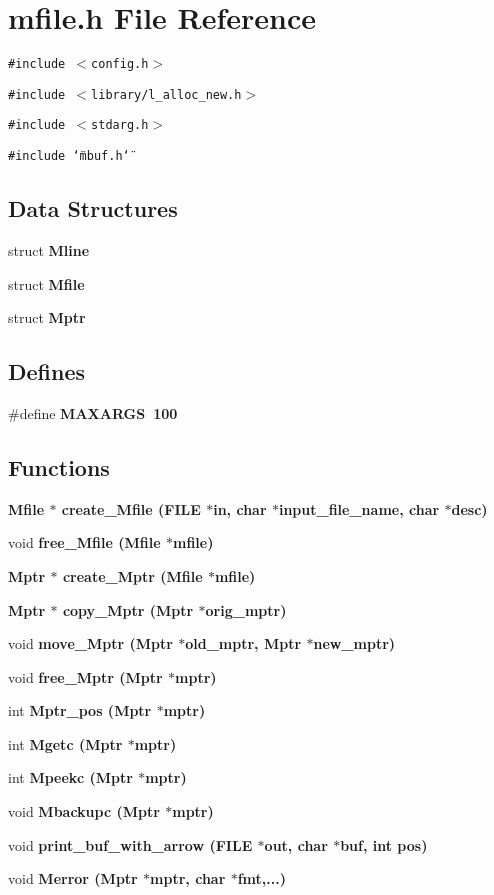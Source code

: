 \section{mfile.h File Reference}
\label{mfile_8h}
{\tt \#include $<$config.h$>$}\par
{\tt \#include $<$library/l\_\-alloc\_\-new.h$>$}\par
{\tt \#include $<$stdarg.h$>$}\par
{\tt \#include \char`\"{}mbuf.h\char`\"{}}\par
\subsection*{Data Structures}
\begin{CompactItemize}
\item 
struct \bf{Mline}
\item 
struct \bf{Mfile}
\item 
struct \bf{Mptr}
\end{CompactItemize}
\subsection*{Defines}
\begin{CompactItemize}
\item 
\#define \bf{MAXARGS}~100
\end{CompactItemize}
\subsection*{Functions}
\begin{CompactItemize}
\item 
\bf{Mfile} $\ast$ \bf{create\_\-Mfile} (FILE $\ast$in, char $\ast$input\_\-file\_\-name, char $\ast$desc)
\item 
void \bf{free\_\-Mfile} (\bf{Mfile} $\ast$mfile)
\item 
\bf{Mptr} $\ast$ \bf{create\_\-Mptr} (\bf{Mfile} $\ast$mfile)
\item 
\bf{Mptr} $\ast$ \bf{copy\_\-Mptr} (\bf{Mptr} $\ast$orig\_\-mptr)
\item 
void \bf{move\_\-Mptr} (\bf{Mptr} $\ast$old\_\-mptr, \bf{Mptr} $\ast$new\_\-mptr)
\item 
void \bf{free\_\-Mptr} (\bf{Mptr} $\ast$mptr)
\item 
int \bf{Mptr\_\-pos} (\bf{Mptr} $\ast$mptr)
\item 
int \bf{Mgetc} (\bf{Mptr} $\ast$mptr)
\item 
int \bf{Mpeekc} (\bf{Mptr} $\ast$mptr)
\item 
void \bf{Mbackupc} (\bf{Mptr} $\ast$mptr)
\item 
void \bf{print\_\-buf\_\-with\_\-arrow} (FILE $\ast$out, char $\ast$buf, int pos)
\item 
void \bf{Merror} (\bf{Mptr} $\ast$mptr, char $\ast$fmt,...)
\end{CompactItemize}
